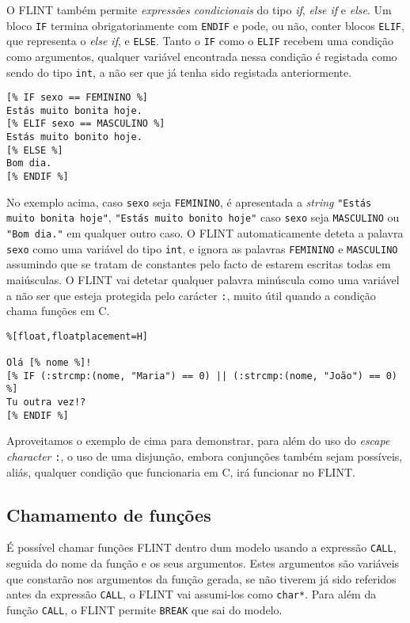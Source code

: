 O FLINT também permite \emph{expressões condicionais} do tipo \emph{if}, \emph{else if} e \emph{else}. Um bloco \texttt{IF} termina obrigatoriamente com \texttt{ENDIF} e pode, ou não, conter blocos \texttt{ELIF}, que representa o \textit{else if}, e \texttt{ELSE}. Tanto o \texttt{IF} como o \texttt{ELIF} recebem uma condição como argumentos, qualquer variável encontrada nessa condição é registada como sendo do tipo \texttt{int}, a não ser que já tenha sido registada anteriormente.

\begin{lstlisting}[float,floatplacement=H]
[% IF sexo == FEMININO %]
Estás muito bonita hoje.
[% ELIF sexo == MASCULINO %]
Estás muito bonito hoje.
[% ELSE %]
Bom dia.
[% ENDIF %]
\end{lstlisting}

No exemplo acima, caso \texttt{sexo} seja \texttt{FEMININO},  é apresentada a \textit{string} \texttt{"Estás muito bonita hoje"}, \texttt{"Estás muito bonito hoje"} caso \texttt{sexo} seja \texttt{MASCULINO} ou \texttt{"Bom dia."} em qualquer outro caso. O FLINT automaticamente deteta a palavra \texttt{sexo} como uma variável do tipo \texttt{int}, e ignora as palavras \texttt{FEMININO} e \texttt{MASCULINO} assumindo que se tratam de constantes pelo facto de estarem escritas todas em maiúsculas. O FLINT vai detetar qualquer palavra minúscula como uma variável a não ser que esteja protegida pelo carácter \texttt{:}, muito útil quando a condição chama funções em C. 

\noindent
\begin{minipage}{\textwidth}
\begin{lstlisting}%[float,floatplacement=H]

Olá [% nome %]!
[% IF (:strcmp:(nome, "Maria") == 0) || (:strcmp:(nome, "João") == 0) %]
Tu outra vez!?
[% ENDIF %]
\end{lstlisting}
\end{minipage}

Aproveitamos o exemplo de cima para demonstrar, para além do uso do \textit{escape character} \texttt{:}, o uso de uma disjunção, embora conjunções também sejam possíveis, aliás, qualquer condição que funcionaria em C, irá funcionar no FLINT.

\subsection{Chamamento de funções}

É possível chamar funções FLINT dentro dum modelo usando a expressão \texttt{CALL}, seguida do nome da função e os seus argumentos. Estes argumentos são variáveis que constarão nos argumentos da função gerada, se não tiverem já sido referidos antes da expressão \texttt{CALL}, o FLINT vai assumi-los como \texttt{char*}. Para além da função \texttt{CALL}, o FLINT permite \texttt{BREAK} que sai do modelo.


